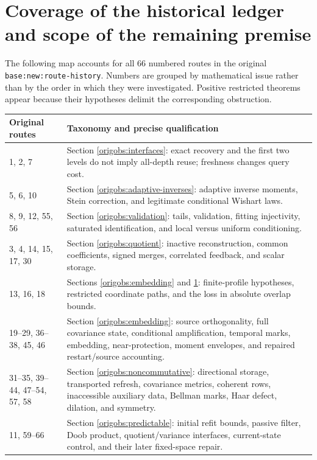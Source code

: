 \documentclass[11pt,oneside,openany,a4paper]{report}
\numberwithin{equation}{chapter}
\theoremstyle{definition}
\theoremstyle{remark}
\begin{document}
\section{Coverage of the historical ledger and scope of the remaining premise}
\label{origobs:coverage}

The following map accounts for all 66 numbered routes in the
original \nolinkurl{base:new:route-history}.  Numbers are grouped by
mathematical issue rather than by the order in which they were
investigated.  Positive restricted theorems appear because their
hypotheses delimit the corresponding obstruction.

\begin{center}
\small
\begin{tabular}{p{.18\linewidth}p{.75\linewidth}}
\hline
Original routes & Taxonomy and precise qualification\\
\hline
1, 2, 7 &
Section \ref{origobs:interfaces}: exact recovery and the first two
levels do not imply all-depth reuse; freshness changes query cost.\\
5, 6, 10 &
Section \ref{origobs:adaptive-inverses}: adaptive inverse moments,
Stein correction, and legitimate conditional Wishart laws.\\
8, 9, 12, 55, 56 &
Section \ref{origobs:validation}: tails, validation, fitting
injectivity, saturated identification, and local versus uniform
conditioning.\\
3, 4, 14, 15, 17, 30 &
Section \ref{origobs:quotient}: inactive reconstruction, common
coefficients, signed merges, correlated feedback, and scalar storage.\\
13, 16, 18 &
Sections \ref{origobs:embedding} and \ref{origobs:coverage}:
finite-profile hypotheses, restricted coordinate paths, and the
loss in absolute overlap bounds.\\
19--29, 36--38, 45, 46 &
Section \ref{origobs:embedding}: source orthogonality, full covariance
state, conditional amplification, temporal marks, embedding,
near-protection, moment envelopes, and repaired restart/source
accounting.\\
31--35, 39--44, 47--54, 57, 58 &
Section \ref{origobs:noncommutative}: directional storage,
transported refresh, covariance metrics, coherent rows, inaccessible
auxiliary data, Bellman marks, Haar defect, dilation, and symmetry.\\
11, 59--66 &
Section \ref{origobs:predictable}: initial refit bounds, passive
filter, Doob product, quotient/variance interfaces, current-state
control, and their later fixed-space repair.\\
\hline
\end{tabular}
\end{center}
\end{document}
